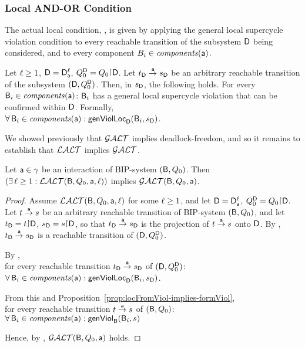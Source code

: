 \subsubsection{Local AND-OR Condition}

The actual local condition, \LAO, is given by applying the general local supercycle violation condition to every reachable transition 
of the subsystem $\dsk{\act}{\l}$ being considered, and to every component $B_i \in \cmps{\act}$.

\begin{definition} \label{def:lao} \label{defn:lao}
Let $\l \ge 1$, $\DS = \dsks{\act}{\l}$, $\QDS = Q_0 \pj \DS$.
Let $\tD \goesto[\act] \sD$ be an arbitrary reachable transition of the subsystem $(\DS, \QDS)$. 
Then, in $\sD$, the following holds. 
For every $\B_i \in \cmps{\act}$:  
$\B_i$ has a general local supercycle violation that can be confirmed within $\dsk{\act}{\l}$.
Formally,\\
\ind  $\fa \B_i \in \cmps{\act} : \locFormViol{\B_i}{\sD}{\act}{\l}$.
\end{definition}
%

%
We showed previously that $\GAO$ implies deadlock-freedom, and so it remains to establish that $\LAO$ implies $\GAO$. 


\begin{lemma}
\label{lem:loc.ANDOR.implies.glob.AND-OR}
\label{lemma:loc.ANDOR.implies.glob.AND-OR}
\label{LAOGAO}
Let $\act \in \gamma$ be an interaction of BIP-system $(\B, Q_0)$. Then\\
\ind $(\ex \l \ge 1: \LAO(\B, Q_0, \act, \l))$ implies $\GAO(\B, Q_0, \act)$. 
\end{lemma}
%
\begin{proof}
Assume $\LAO(\B, Q_0, \act, \l)$ for some $\l \ge 1$, and let $\DS = \dsks{\act}{\l}$, $\QDS = Q_0 \pj \DS$.
%
Let $t \goesto[\act] s$ be an arbitrary reachable transition of BIP-system $(\B, Q_0)$, and let 
$\tD = t \pj \DS$, $\sD = s \pj \DS$, so that 
$\tD \goesto[\act] \sD$ is the projection of $t \goesto[\act] s$ onto $\dsk{\act}{\l}$.
By , $\tD \goesto[\act] \sD$ is a reachable transition of $(\DS, \QDS)$.

\noindent
By ,\\
\ind for every reachable transition $\tD \goesto[\act] \sD$ of $(\DS, \QDS)$:\\
\ind \ind $\fa \B_i \in \cmps{\act} : \locFormViol{\B_i}{\sD}{\act}{\l}$.

\noindent
From this and Proposition~\ref{prop:locFromViol-implies-formViol},\\
\ind for every reachable transition $t \goesto[\act] s$ of  $(\B, Q_0)$:\\ 
\ind \ind $\fa \B_i \in \cmps{\act} : \formViol{\B_i}{s}$

\noindent
Hence, by , $\GAO(\B, Q_0, \act)$ holds.
\end{proof}



